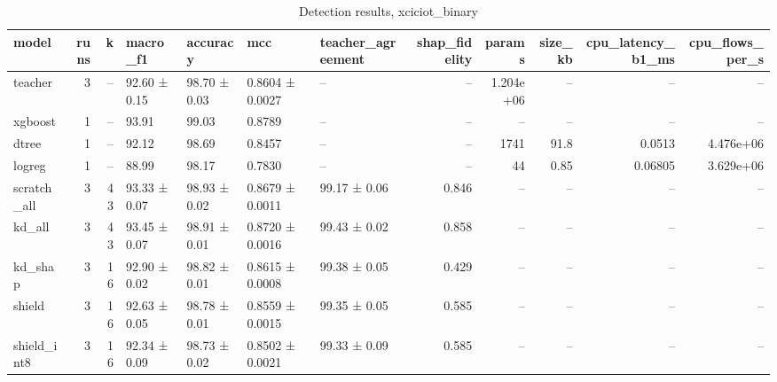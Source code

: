 \begin{table}
\caption{Detection results, xciciot_binary}
\begin{tabular}{lrrllllrrrrr}
\toprule
model & runs & k & macro_f1 & accuracy & mcc & teacher_agreement & shap_fidelity & params & size_kb & cpu_latency_b1_ms & cpu_flows_per_s \\
\midrule
teacher & 3 & -- & 92.60 ± 0.15 & 98.70 ± 0.03 & 0.8604 ± 0.0027 & -- & -- & 1.204e+06 & -- & -- & -- \\
xgboost & 1 & -- & 93.91 & 99.03 & 0.8789 & -- & -- & -- & -- & -- & -- \\
dtree & 1 & -- & 92.12 & 98.69 & 0.8457 & -- & -- & 1741 & 91.8 & 0.0513 & 4.476e+06 \\
logreg & 1 & -- & 88.99 & 98.17 & 0.7830 & -- & -- & 44 & 0.85 & 0.06805 & 3.629e+06 \\
scratch_all & 3 & 43 & 93.33 ± 0.07 & 98.93 ± 0.02 & 0.8679 ± 0.0011 & 99.17 ± 0.06 & 0.846 & -- & -- & -- & -- \\
kd_all & 3 & 43 & 93.45 ± 0.07 & 98.91 ± 0.01 & 0.8720 ± 0.0016 & 99.43 ± 0.02 & 0.858 & -- & -- & -- & -- \\
kd_shap & 3 & 16 & 92.90 ± 0.02 & 98.82 ± 0.01 & 0.8615 ± 0.0008 & 99.38 ± 0.05 & 0.429 & -- & -- & -- & -- \\
shield & 3 & 16 & 92.63 ± 0.05 & 98.78 ± 0.01 & 0.8559 ± 0.0015 & 99.35 ± 0.05 & 0.585 & -- & -- & -- & -- \\
shield_int8 & 3 & 16 & 92.34 ± 0.09 & 98.73 ± 0.02 & 0.8502 ± 0.0021 & 99.33 ± 0.09 & 0.585 & -- & -- & -- & -- \\
\bottomrule
\end{tabular}
\end{table}
